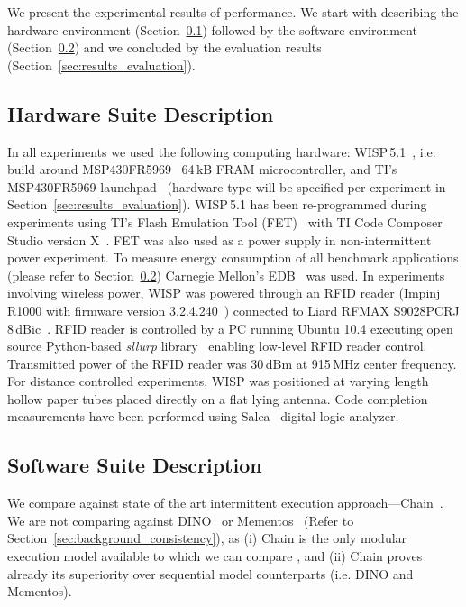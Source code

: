 We present the experimental results of \sys performance. We start with describing the hardware environment (Section~\ref{sec:results_hardware}) followed by the software environment (Section~\ref{sec:results_software}) and we concluded by the evaluation results (Section~\ref{sec:results_evaluation}).

\subsection{Hardware Suite Description}
\label{sec:results_hardware}

In all experiments we used the following computing hardware: WISP\,5.1~\cite{wisp5,wisp}, i.e. build around MSP430FR5969~\cite{wolverine} 64\,kB FRAM microcontroller, and TI's MSP430FR5969 launchpad~\cite{MSP-EXP430FR5969_launchpad} (hardware type will be specified per experiment in Section~\ref{sec:results_evaluation}). WISP\,5.1 has been re-programmed during experiments using TI's Flash Emulation Tool (FET)~\cite{fet} with TI Code Composer Studio version X~\cite{}. FET was also used as a power supply in non-intermittent power experiment. To measure energy consumption of all benchmark applications (please refer to Section~\ref{sec:results_software}) Carnegie Mellon's EDB~\cite{edb} was used. In experiments involving wireless power, WISP was powered through an RFID reader (Impinj R1000 with firmware version 3.2.4.240~\cite{r1000_data_sheet}) connected to Liard RFMAX S9028PCRJ 8\,dBic~\cite{atlas2015}. RFID reader is controlled by a PC running Ubuntu 10.4 executing open source Python-based \emph{sllurp} library~\cite{sllrp_github} enabling low-level RFID reader control. Transmitted power of the RFID reader was 30\,dBm at 915\,MHz center frequency. For distance controlled experiments, WISP was positioned at varying length hollow paper tubes placed directly on a flat lying antenna. Code completion measurements have been performed using Salea~\cite{saleae} digital logic analyzer.

\subsection{Software Suite Description}
\label{sec:results_software}

We compare \sys against state of the art intermittent execution approach---Chain~\cite{chain}. We are not comparing \sys against DINO~\cite{dino} or Mementos~\cite{mementos} (Refer to Section~\ref{sec:background_consistency}), as (i) Chain is the only modular execution model available to which we can compare \sys, and (ii) Chain proves already its superiority over sequential model counterparts (i.e. DINO and Mementos).


